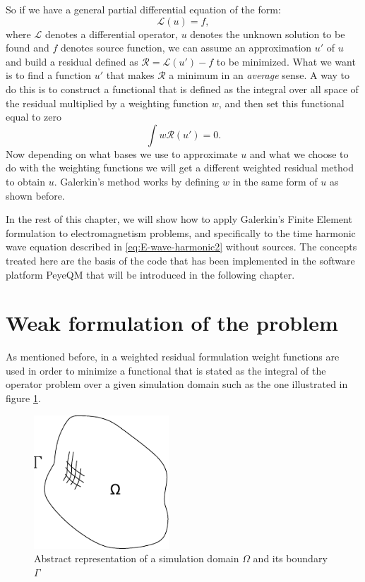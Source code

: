 So if we have a general partial differential equation of the form: 
\begin{equation}
\mathcal{L}(u) = f,
\label{eq:general_form_of_DE}
\end{equation}  where $\mathcal{L}$ denotes a differential operator, $u$ denotes the unknown solution to be found and $f$ denotes source function, we can assume an approximation $u'$ of $u$ and build a residual defined as $\mathcal{R} = \mathcal{L}(u')-f$ to be minimized. What we want is to find a function $u'$ that makes $\mathcal{R}$ a minimum in an \emph{average} sense. A way to do this is to construct a functional that is defined as the integral over all space of the residual multiplied by a weighting function $w$, and then set this functional equal to zero 
\begin{equation}
\int w \mathcal{R}(u') = 0.
\end{equation}
Now depending on what bases we use to approximate $u$ and what we choose to do with the weighting functions we will get a different weighted residual method to obtain $u$. 
Galerkin's method works by defining $w$ in the same form of $u$ as shown before.

In the rest of this chapter, we will show how to apply Galerkin's Finite Element formulation to electromagnetism problems, and specifically to the time harmonic wave equation described in \ref{eq:E-wave-harmonic2} without sources. The concepts treated here are the basis of the code that has been implemented in the software platform PeyeQM that will be introduced in the following chapter.

\section{Weak formulation of the problem}

As mentioned before, in a weighted residual formulation weight functions  are used in order to minimize a functional that is stated as the integral of the operator problem over a given  simulation domain such as the one illustrated in figure \ref{fig:domain}. 

\begin{figure}[h]
\centering
\includegraphics[height=5cm]{./img/dominio.pdf}
\caption{Abstract representation of a simulation domain $\Omega$ and its boundary $\Gamma$}
\label{fig:domain}
\end{figure}

